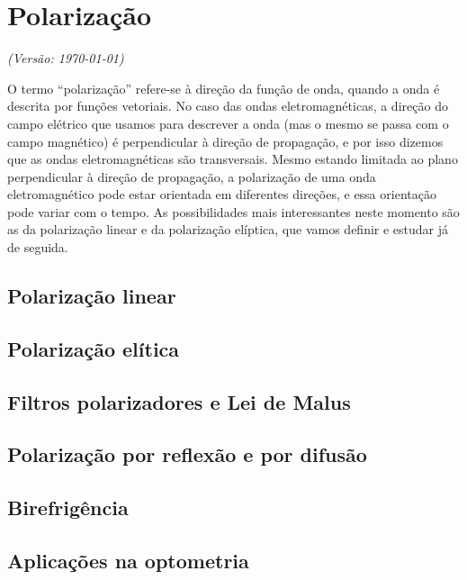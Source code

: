 \chapter{Polarização}
\textsl{{\sffamily(Versão: \today)}}

\noindent
O termo ``polarização'' refere-se à direção da função de onda, quando a onda é
descrita por funções vetoriais. No caso das ondas eletromagnéticas, a
direção do campo elétrico que usamos para descrever a onda (mas o mesmo se passa
com o campo magnético) é perpendicular à direção de propagação, e por isso
dizemos que as ondas eletromagnéticas são transversais. Mesmo estando limitada
ao plano perpendicular à direção de propagação, a polarização de uma onda
eletromagnético pode estar orientada em diferentes direções, e essa orientação
pode variar com o tempo. As possibilidades mais interessantes neste momento são
as da polarização linear e da polarização elíptica, que vamos definir e estudar
já de seguida.

\section{Polarização linear}
\tobedone{}
\section{Polarização elítica}
\tobedone{}
\section{Filtros polarizadores e Lei de Malus}
\tobedone{}
\section{Polarização por reflexão e por difusão}
\tobedone{}
\section{Birefrigência}
\tobedone{}
\section{Aplicações na optometria}
\tobedone{}
